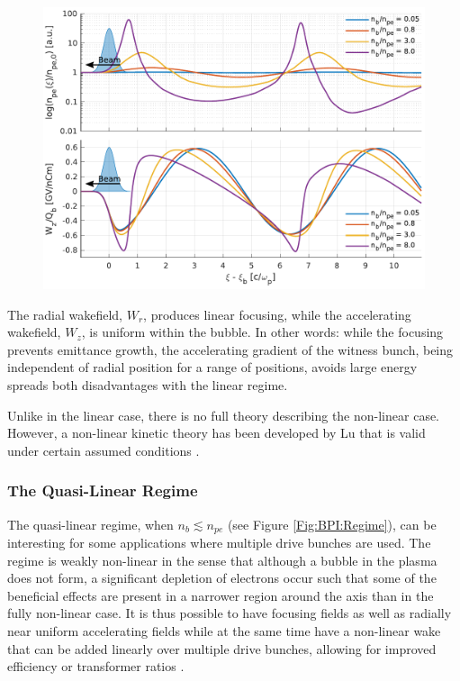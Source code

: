 \begin{figure}[hbt]
    \centering
    \includegraphics[width=0.875\linewidth,trim={0mm 0mm 0mm 0mm},clip]{figures/Density}
    \caption{\label{Fig:BPI:Density} }
\end{figure}

The radial wakefield, $W_{r}$, produces linear focusing, while the accelerating wakefield, $W_{z}$, is uniform within the bubble. In other words: while the focusing prevents emittance growth, the accelerating gradient of the witness bunch, being independent of radial position for a range of positions, avoids large energy spreads \dash both disadvantages with the linear regime.

Unlike in the linear case, there is no full theory describing the non-linear case. However, a non-linear kinetic theory has been developed by Lu \etal that is valid under certain assumed conditions \cite{lu:2006a,lu:2006}.

\subsubsection{The Quasi-Linear Regime}
\label{Int:BPI:QLin}

The quasi-linear regime, when $n_{b} \lesssim n_{pe}$ (see Figure \ref{Fig:BPI:Regime}), can be interesting for some applications where multiple drive bunches are used. The regime is weakly non-linear in the sense that although a bubble in the plasma does not form, a significant depletion of electrons occur such that some of the beneficial effects are present in a narrower region around the axis than in the fully non-linear case. It is thus possible to have focusing fields as well as radially near uniform accelerating fields while at the same time have a non-linear wake that can be added linearly over multiple drive bunches, allowing for improved efficiency or transformer ratios \cite{muggli:2017,rosenzweig:2010}.

